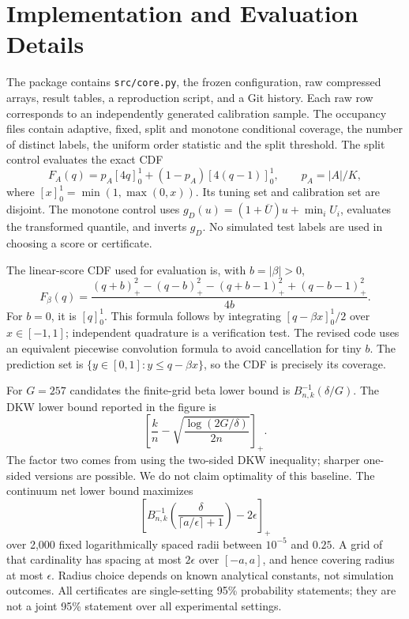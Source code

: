 \documentclass{article}
\begin{document}
\section{Implementation and Evaluation Details}\label{app:implementation}

The package contains \texttt{src/core.py}, the frozen configuration, raw compressed arrays, result tables, a reproduction script, and a Git history. Each raw row corresponds to an independently generated calibration sample. The occupancy files contain adaptive, fixed, split and monotone conditional coverage, the number of distinct labels, the uniform order statistic and the split threshold. The split control evaluates the exact CDF
\begin{equation}
 F_A(q)=p_A[4q]_0^1+(1-p_A)[4(q-1)]_0^1,\qquad p_A=|A|/K,
\end{equation}
where $[x]_0^1=\min(1,\max(0,x))$. Its tuning set and calibration set are disjoint. The monotone control uses $g_D(u)=(1+\overline U)u+\min_iU_i$, evaluates the transformed quantile, and inverts $g_D$. No simulated test labels are used in choosing a score or certificate.

The linear-score CDF used for evaluation is, with $b=|\beta|>0$,
\begin{equation}
 F_\beta(q)=\frac{(q+b)_+^2-(q-b)_+^2-(q+b-1)_+^2+(q-b-1)_+^2}{4b}.
\end{equation}
For $b=0$, it is $[q]_0^1$. This formula follows by integrating $[q-\beta x]_0^1/2$ over $x\in[-1,1]$; independent quadrature is a verification test. The revised code uses an equivalent piecewise convolution formula to avoid cancellation for tiny $b$. The prediction set is $\{y\in[0,1]:y\le q-\beta x\}$, so the CDF is precisely its coverage.

For $G=257$ candidates the finite-grid beta lower bound is $B_{n,k}^{-1}(\delta/G)$. The DKW lower bound reported in the figure is
\begin{equation}
 \left[\frac{k}{n}-\sqrt{\frac{\log(2G/\delta)}{2n}}\right]_+.
\end{equation}
The factor two comes from using the two-sided DKW inequality; sharper one-sided versions are possible. We do not claim optimality of this baseline. The continuum net lower bound maximizes
\begin{equation}
 \left[B_{n,k}^{-1}\left(\frac{\delta}{\lceil a/\epsilon\rceil+1}\right)-2\epsilon\right]_+
\end{equation}
over 2,000 fixed logarithmically spaced radii between $10^{-5}$ and $0.25$. A grid of that cardinality has spacing at most $2\epsilon$ over $[-a,a]$, and hence covering radius at most $\epsilon$. Radius choice depends on known analytical constants, not simulation outcomes. All certificates are single-setting 95\% probability statements; they are not a joint 95\% statement over all experimental settings.
\end{document}
